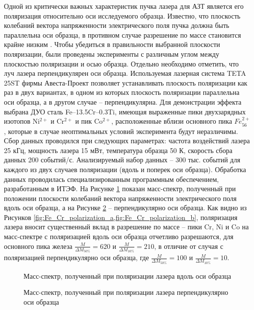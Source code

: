 Одной из критически важных характеристик пучка лазера для АЗТ является его поляризация относительно оси исследуемого образца. Известно, что плоскость колебаний вектора напряженности электрического поля пучка должна быть параллельна оси образца, в противном случае разрешение по массе становится крайне низким \cite{Houard10}. Чтобы убедиться в правильности выбранной плоскости поляризации, были проведены эксперименты с различным углом между плоскостью поляризации и осью образца. Отдельно необходимо отметить, что луч лазера перпендикулярен оси образца. Используемая лазерная система TETA 25ST фирмы Авеста-Проект позволяет устанавливать плоскость поляризации как раз в двух вариантах, в одном из которых плоскость поляризации параллельна оси образца, а в другом случае – перпендикулярна. Для демонстрации эффекта выбрана ДУО сталь Fe–13.5Cr–0.3Ti, имеющая выраженные пики двухзарядных изотопов Ni$^{2+}$ и Cr$^{2+}$ и пик Co$^{2+}$, расположенные вблизи основного пика $Fe_{56} ^{2+}$, которые в случае неоптимальных условий эксперимента будут неразличимы. Сбор данных проводился при следующих параметрах: частота воздействий лазера 25 кГц, мощность лазера 15 мВт, температура образца 50 К, скорость сбора данных 200 событий/с. Анализируемый набор данных – 300 тыс. событий для каждого из двух случаев поляризации (вдоль и поперек оси образца). Обработка данных проводилась специализированным программным обеспечением, разработанным в ИТЭФ. На Рисунке \cref{fig:Fe_Cr_polarization_a} показан масс-спектр, полученный при положении плоскости колебаний вектора напряженности электрического поля вдоль оси образца, а на Рисунке \cref{fig:Fe_Cr_polarization_b} – перпендикулярно оси образца. Как видно из Рисунков \cref{fig:Fe_Cr_polarization_a,fig:Fe_Cr_polarization_b}, поляризация лазера вносит существенный вклад в разрешение по массе – пики Cr, Ni и Co на масс-спектре с поляризацией вдоль оси образца отчетливо разрешаются, для основного пика железа $\frac{M}{\Delta M_{50\%}} = 620$ и $\frac{M}{\Delta M_{10\%}} = 210$, в отличие от случая с поляризацией перпендикулярно оси образца, где $\frac{M}{\Delta M_{50\%}} = 100$ и $\frac{M}{\Delta M_{10\%}} = 10$.

\begin{figure}[htb]
	\caption{Масс-спектр, полученный при поляризации лазера вдоль оси образца}
	\label{fig:Fe_Cr_polarization_a}
\end{figure}
\begin{figure}[htb]
	\caption{Масс-спектр, полученный при поляризации лазера перпендикулярно оси образца}
	\label{fig:Fe_Cr_polarization_b}
\end{figure}


